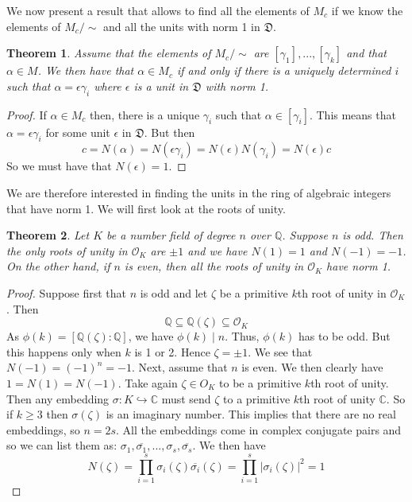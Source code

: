 \documentclass{article}
\newtheorem{theorem}{Theorem}[section]
\newcommand{\mfrak}[1]{\mathfrak{#1}}
\newcommand{\mcal}[1]{\mathcal{#1}}
\newcommand{\mbb}[1]{\mathbb{#1}}
\begin{document}
We now present a result that allows to find all the elements of $M_c$ if we know the elements of $M_c / \sim$ and all the units with norm 1 in $\mfrak D$.
\begin{theorem}
    Assume that the elements of $M_c / \sim$ are $[\gamma_1], ..., [\gamma_k]$ and that $\alpha \in M$. We then have that $\alpha \in M_c$ if and only if there is a uniquely determined $i$ such that $\alpha = \epsilon \gamma_i$ where $\epsilon$ is a unit in $\mfrak D$ with norm 1.
\end{theorem}

\begin{proof}
    
If $\alpha \in M_c$ then, there is a unique $\gamma_i$ such that $\alpha \in [\gamma_i]$. This means that $\alpha = \epsilon \gamma_i$ for some unit $\epsilon$ in $\mfrak D$. But then $$c = N(\alpha) = N(\epsilon \gamma_i) = N(\epsilon)N(\gamma_i) = N(\epsilon)c$$
So we must have that $N(\epsilon) = 1$. 
\end{proof}

We are therefore interested in finding the units in the ring of algebraic integers that have norm 1. We will first look at the roots of unity. 

\begin{theorem}
    Let $K$ be a number field of degree $n$ over $\mbb Q$. Suppose $n$ is odd. Then the only roots of unity in $\mcal O_K$ are $\pm 1$ and we have $N(1) = 1$ and $N(-1) = -1$. On the other hand, if $n$ is even, then all the roots of unity in $\mcal O_K$ have norm 1.
\end{theorem}
\begin{proof}
    Suppose first that $n$ is odd and let $\zeta$ be a primitive $k$th root of unity in $\mcal O_K$. Then 
    $$\mbb Q \subseteq \mbb Q(\zeta) \subseteq \mcal O_K$$
    As $\phi(k) = [\mbb Q(\zeta) : \mbb Q]$, we have $\phi(k) \mid n$. Thus, $\phi(k)$ has to be odd. But this happens only when $k$ is 1 or 2. Hence $\zeta = \pm 1$. We see that $N(-1) = (-1)^n = -1$. Next, assume that $n$ is even. We then clearly have $1 = N(1) = N(-1)$. Take again $\zeta \in O_K$ to be a primitive $k$th root of unity. Then any embedding $\sigma : K \hookrightarrow \mbb C$ must send $\zeta$ to a primitive $k$th root of unity $\mbb C$. So if $k \geq 3$ then $\sigma(\zeta)$ is an imaginary number. This implies that there are no real embeddings, so $n = 2s$. All the embeddings come in complex conjugate pairs and so we can list them as: $\sigma_1, \overline{\sigma_1}, ... , \sigma_s, \overline{\sigma_s}$. We then have
    $$N(\zeta) = \prod_{i=1}^s \sigma_i(\zeta) \overline{\sigma_i}(\zeta) = \prod_{i=1}^s |\sigma_i(\zeta)|^2 = 1$$
\end{proof}
\end{document}
